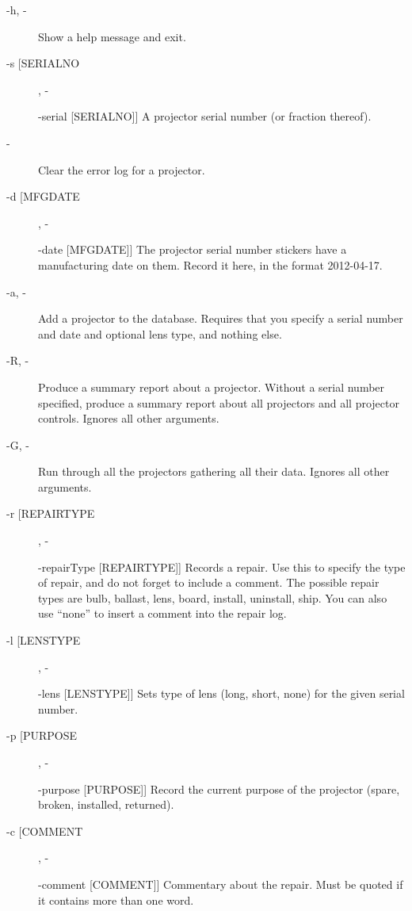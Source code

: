 \documentclass[11pt]{article}
\newcommand{\longcommand}[1]{-\rule{0pt}{1pt}-#1}
\newcommand{\argle}[1]{[#1]}
\begin{document}
\begin{description}
\item[-h, \longcommand{help}] Show a help message and exit.
\item[-s \argle{SERIALNO}, \longcommand{serial} \argle{SERIALNO}]
                        A projector serial number (or fraction
                        thereof).
\item[\longcommand{clearErrs}]   Clear the error log for a projector.
\item[-d \argle{MFGDATE}, \longcommand{date} \argle{MFGDATE}]
                        The projector serial number stickers have a
                        manufacturing date on them. Record it here, in the
                        format 2012-04-17.
\item[-a, \longcommand{add}] Add a projector to the
                        database. Requires that you specify a serial number
                        and date and optional lens type, and nothing else.
\item[-R, \longcommand{report}]     Produce a summary report about a projector. Without a
                        serial number specified, produce a summary report
                        about all projectors and all projector controls.
                        Ignores all other arguments.
\item[-G, \longcommand{gather}]    Run through all the projectors gathering all their
                        data. Ignores all other arguments.
\item[-r \argle{REPAIRTYPE}, \longcommand{repairType} \argle{REPAIRTYPE}]
                        Records a repair. Use this to
                        specify the type of repair, and do not forget to
                        include a comment.  The possible repair types
                        are bulb, ballast, lens, board, install,
                        uninstall, ship.  You can also use ``none'' to
                        insert a comment into the repair log.
\item[-l \argle{LENSTYPE}, \longcommand{lens} \argle{LENSTYPE}]
                        Sets type of lens (long, short, none) for the given
                        serial number.
\item[-p \argle{PURPOSE}, \longcommand{purpose} \argle{PURPOSE}]
                        Record the current purpose of the projector (spare,
                        broken, installed, returned).
\item[-c \argle{COMMENT}, \longcommand{comment} \argle{COMMENT}]
                        Commentary about the repair.  Must be quoted
                        if it contains more than one word.

                      \end{description}
                      
\end{document}

